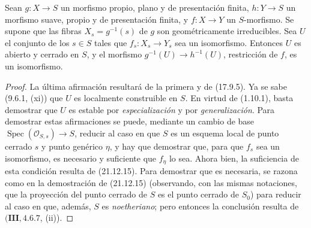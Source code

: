 \begin{corollary}[21.12.16]
\label{IV.21.12.16}
Sean $g:X\to S$ un morfismo propio, plano y de presentación finita, $h:Y\to S$ un
morfismo suave, propio y de presentación finita, y $f:X\to Y$ un $S$-morfismo. Se
supone que las fibras $X_s=g^{-1}(s)$ de $g$ son geométricamente irreducibles. Sea
$U$ el conjunto de los $s\in S$ tales que $f_s:X_s\to Y_s$ sea un isomorfismo. Entonces
$U$ es abierto y cerrado en $S$, y el morfismo $g^{-1}(U)\to h^{-1}(U)$,
restricción de $f$, es un isomorfismo.
\end{corollary}

\begin{proof}
La última afirmación resultará de la primera y de (17.9.5). Ya se sabe (9.6.1,
(xi)) que $U$ es localmente construible en $S$. En virtud de (1.10.1), basta
demostrar que $U$ es estable por \emph{especialización} y por \emph{generalización}. Para
demostrar estas afirmaciones se
puede, mediante un cambio de base $\operatorname{Spec}(\mathcal O_{S,s})\to S$,
reducir al caso en que $S$ es un esquema local de punto cerrado $s$ y punto genérico
$\eta$, y hay que demostrar que, para que $f_s$ sea un isomorfismo, es necesario y suficiente
que $f_\eta$ lo sea. Ahora bien, la suficiencia de esta condición resulta de (21.12.15). Para
demostrar que es necesaria, se razona como en la demostración de (21.12.15)
(observando, con las mismas notaciones, que la proyección del punto cerrado de $S$ es el
punto cerrado de $S_0$) para reducir al caso en que, además, $S$ es \emph{noetheriano};
pero entonces la conclusión resulta de $(\mathbf{III}, 4.6.7$, (ii)).
\end{proof}


